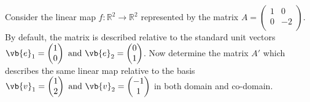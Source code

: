 \documentclass[a4paper,12pt]{report}
\begin{document}
{Consider the linear map \(f: \mathbb{R}^2 \rightarrow \mathbb{R}^2\) represented by the matrix    \(A = \begin{pmatrix}
        1 &  0 \\
        0 &  -2 \\
    \end{pmatrix}\). By default, the matrix is described relative to the standard unit vectors \(\vb{e} _{1} = \begin{pmatrix}
     1 \\
     0 \\
\end{pmatrix} \text { and } \vb{e} _{2} = \begin{pmatrix}
     0 \\
     1 \\
\end{pmatrix}  \). Now determine the matrix \(A'\) which describes the same linear map relative to the basis \(\vb{v} _{1} = \begin{pmatrix}
     1 \\
     2 \\
\end{pmatrix} \text { and }  \vb{v} _{2} = \begin{pmatrix}
     -1 \\
     1 \\
\end{pmatrix}    \) in both domain and co-domain.}
\end{document}
